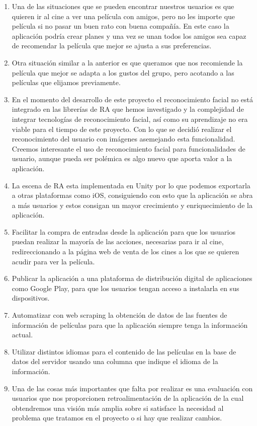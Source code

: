 \begin{enumerate}
    \item Una de las situaciones que se pueden encontrar nuestros usuarios es
     que quieren ir al cine a ver una película con amigos, pero no les importe
     que película si no pasar un buen rato con buena compañía. En este caso la
     aplicación podría crear planes y una vez se unan todos los amigos sea capaz
     de recomendar la película que mejor se ajusta a sus preferencias.
    \item Otra situación similar a la anterior es que queramos que nos
     recomiende la película que mejor se adapta a los gustos del grupo, pero
     acotando a las películas que elijamos previamente.
    \item En el momento del desarrollo de este proyecto el reconocimiento facial
     no está integrado en las librerías de RA que hemos investigado y la
     complejidad de integrar tecnologías de reconocimiento facial, así como su
     aprendizaje no era viable para el tiempo de este proyecto.
    Con lo que se decidió realizar el reconocimiento del usuario con imágenes
     asemejando esta funcionalidad. Creemos interesante el uso de
     reconocimiento facial para funcionalidades de usuario, aunque pueda ser
     polémica es algo nuevo que aporta valor a la aplicación.
    \item La escena de RA esta implementada en Unity por lo que podemos
     exportarla a otras plataformas como iOS, consiguiendo con esto que la
     aplicación se abra a más usuarios y estos consigan un mayor crecimiento y
     enriquecimiento de la aplicación.
    \item Facilitar la compra de entradas desde la aplicación para que los
     usuarios puedan realizar la mayoría de las acciones, necesarias para ir al
     cine, redireccionando a la página web de venta de los cines a los que se
     quieren acudir para ver la película.
    \item Publicar la aplicación a una plataforma de distribución digital de
    aplicaciones como Google Play, para que los usuarios tengan acceso a
    instalarla en sus dispositivos.
    \item Automatizar con web scraping la obtención de datos de las fuentes de
     información de películas para que la aplicación siempre tenga la
     información actual.
    \item Utilizar distintos idiomas para el contenido de las películas en la
     base de datos del servidor usando una columna que indique el idioma de la
     información.
    \item Una de las cosas más importantes que falta por realizar es una
     evaluación con usuarios que nos proporcionen retroalimentación de la
     aplicación de la cual obtendremos una visión más amplia sobre si satisface
     la necesidad al problema que tratamos en el proyecto o si hay que realizar
     cambios. 
\end{enumerate}